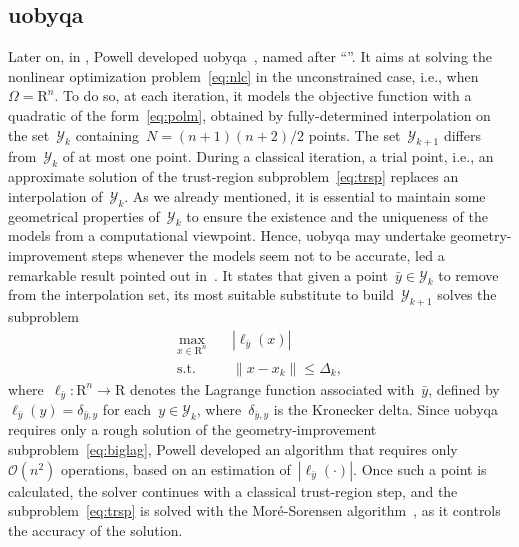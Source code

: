 \documentclass[11pt,draft]{article}
\numberwithin{equation}{section}
\def\R{\ensuremath{\mathds{R}}}
\newcommand\abs[2][]{#1|#2#1|}
\newcommand\norm[2][]{#1\|#2#1\|}
\def\srchsp{\ensuremath{\Omega}}
\newcommand\iter[1][k]{x_{#1}}
\newcommand\trg[1][k]{\Delta_{#1}}
\newcommand\itpls[1][k]{\mathcal{Y}_{#1}}
\def\R{\mbox{R}}
\begin{document}
\subsection{\gls{uobyqa}}

Later on, in , Powell developed \gls{uobyqa}~\cite{Powell_2002}, named after \enquote{}.
It aims at solving the nonlinear optimization problem~\eqref{eq:nlc} in the unconstrained case, i.e., when~$\srchsp = \R^n$.
To do so, at each iteration, it models the objective function with a quadratic of the form~\eqref{eq:polm}, obtained by fully-determined interpolation on the set~$\itpls$ containing~$N = (n + 1)(n + 2) / 2$ points.
The set~$\itpls[k + 1]$ differs from~$\itpls$ of at most one point.
During a classical iteration, a trial point, i.e., an approximate solution of the trust-region subproblem~\eqref{eq:trsp} replaces an interpolation of~$\itpls$.
As we already mentioned, it is essential to maintain some geometrical properties of~$\itpls$ to ensure the existence and the uniqueness of the models from a computational viewpoint.
Hence, \gls{uobyqa} may undertake geometry-improvement steps whenever the models seem not to be accurate, led a remarkable result pointed out in~\cite{Powell_2001}.
It states that given a point~$\bar{y} \in \itpls$ to remove from the interpolation set, its most suitable substitute to build~$\itpls[k + 1]$ solves the subproblem
\begin{equation}
    \label{eq:biglag}
    \begin{aligned}
        \max_{x \in \R^n}   & \quad \abs{\ell_{\bar{y}}(x)}\\
        \text{s.t.}         & \quad \norm{x - \iter} \le \trg,
    \end{aligned}
\end{equation}
where~$\ell_{\bar{y}} \colon \R^n \to \R$ denotes the Lagrange function associated with~$\bar{y}$, defined by~$\ell_{\bar{y}}(y) = \delta_{\bar{y}, y}$ for each~$y \in \itpls$, where~$\delta_{\bar{y}, y}$ is the Kronecker delta.
Since \gls{uobyqa} requires only a rough solution of the geometry-improvement subproblem~\eqref{eq:biglag}, Powell developed an algorithm that requires only~$\mathcal{O}(n^2)$ operations, based on an estimation of~$\abs{\ell_{\bar{y}}(\cdot)}$.
Once such a point is calculated, the solver continues with a classical trust-region step, and the subproblem~\eqref{eq:trsp} is solved with the Mor{\'{e}}-Sorensen algorithm~\cite{More_Sorensen_1983}, as it controls the accuracy of the solution.
\end{document}
